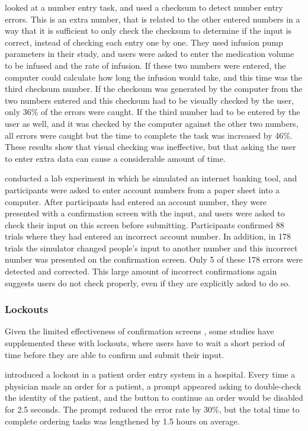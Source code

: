 \documentclass[11pt,oneside]{report}
\begin{document}
\citet{Wiseman2013a} looked at a number entry task, and used a checksum to detect number entry errors. This is an extra number, that is related to the other entered numbers in a way that it is sufficient to only check the checksum to determine if the input is correct, instead of checking each entry one by one. 
They used infusion pump parameters in their study, and users were asked to enter the medication volume to be infused and the rate of infusion. If these two numbers were entered, the computer could calculate how long the infusion would take, and this time was the third checksum number.
If the checksum was generated by the computer from the two numbers entered and this checksum had to be visually checked by the user, only 36\% of the errors were caught. If the third number had to be entered by the user as well, and it was checked by the computer against the other two numbers, all errors were caught but the time to complete the task was increased by 46\%. These results show that visual checking was ineffective, but that asking the user to enter extra data can cause a considerable amount of time.

\citet{Olsen2008} conducted a lab experiment in which he simulated an internet banking tool, and participants were asked to enter account numbers from a paper sheet into a computer. After participants had entered an account number, they were presented with a confirmation screen with the input, and users were asked to check their input on this screen before submitting. 
Participants confirmed 88 trials where they had entered an incorrect account number. In addition, in 178 trials the simulator changed people's input to another number and this incorrect number was presented on the confirmation screen. Only 5 of these 178 errors were detected and corrected. This large amount of incorrect confirmations again suggests users do not check properly, even if they are explicitly asked to do so. 

\subsubsection{Lockouts}
Given the limited effectiveness of confirmation screens \citep{Norman2002, Olsen2008}, some studies have supplemented these with lockouts, where users have to wait a short period of time before they are able to confirm and submit their input. 

\citet{Green2014} introduced a lockout in a patient order entry system in a hospital. Every time a physician made an order for a patient, a prompt appeared asking to double-check the identity of the patient, and the button to continue an order would be disabled for 2.5 seconds. The prompt reduced the error rate by 30\%, but the total time to complete ordering tasks was lengthened by 1.5 hours on average. 
\end{document}
